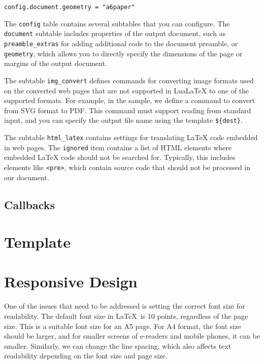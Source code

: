 \documentclass{ltugboat}
\begin{document}
\begin{verbatim}
config.document.geometry = "a6paper"
\end{verbatim}

The \texttt{config} table contains several subtables that you can configure.
The \texttt{document} subtable includes properties of the output document, such
as \texttt{preamble\_extras} for adding additional code to the document
preamble, or \texttt{geometry}, which allows you to directly specify the
dimensions of the page or margins of the output document.

The subtable \texttt{img\_convert} defines commands for converting image formats
used on the converted web pages that are not supported in LuaLaTeX to one of
the supported formats. For example, in the sample, we define a command to
convert from SVG format to PDF. This command must support reading from standard
input, and you can specify the output file name using the template \verb|${dest}|.

The subtable \texttt{html\_latex} contains settings for translating LaTeX code
embedded in web pages. The \texttt{ignored} item contains a list of HTML
elements where embedded LaTeX code should not be searched for. Typically, this
includes elements like \verb|<pre>|, which contain source code that should
not be processed in our document.


\subsection{Callbacks}





\section{Template}
\section{Responsive Design}

One of the issues that need to be addressed is setting the correct font size
for readability. The default font size in \LaTeX\ is 10 points, regardless of
the page size. This is a suitable font size for an A5 page. For A4 format, the
font size should be larger, and for smaller screens of e-readers and mobile
phones, it can be smaller. Similarly, we can change the line spacing, which
also affects text readability depending on the font size and page size.
\end{document}
